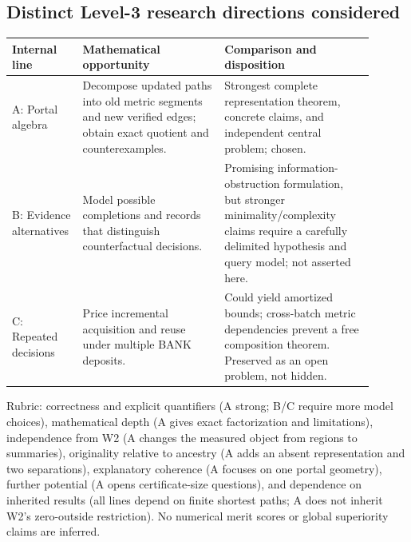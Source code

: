 \documentclass[11pt,letterpaper]{article}
\begin{document}
\subsection*{Distinct Level-3 research directions considered}
\begin{center}\small
\begin{tabular}{@{}p{0.14\linewidth}p{0.37\linewidth}p{0.39\linewidth}@{}}\toprule
Internal line & Mathematical opportunity & Comparison and disposition\\\midrule
A: Portal algebra & Decompose updated paths into old metric segments and new verified edges; obtain exact quotient and counterexamples. & Strongest complete representation theorem, concrete claims, and independent central problem; chosen.\\
B: Evidence alternatives & Model possible completions and records that distinguish counterfactual decisions. & Promising information-obstruction formulation, but stronger minimality/complexity claims require a carefully delimited hypothesis and query model; not asserted here.\\
C: Repeated decisions & Price incremental acquisition and reuse under multiple BANK deposits. & Could yield amortized bounds; cross-batch metric dependencies prevent a free composition theorem. Preserved as an open problem, not hidden.\\\bottomrule
\end{tabular}
\end{center}
Rubric: correctness and explicit quantifiers (A strong; B/C require more model choices), mathematical depth (A gives exact factorization and limitations), independence from W2 (A changes the measured object from regions to summaries), originality relative to ancestry (A adds an absent representation and two separations), explanatory coherence (A focuses on one portal geometry), further potential (A opens certificate-size questions), and dependence on inherited results (all lines depend on finite shortest paths; A does not inherit W2's zero-outside restriction). No numerical merit scores or global superiority claims are inferred.
\end{document}
